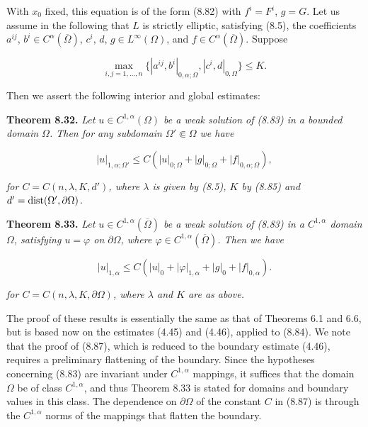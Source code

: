With $x_0$ fixed, this equation is of the form (8.82) with $f^i = F^i$, $g = G$.
Let us assume in the following that $L$ is strictly elliptic, satisfying (8.5), the coefficients $a^{ij}$, $b^i \in C^{\alpha}(\overline{\Omega})$, $c^i$, $d$, $g \in L^{\infty}(\Omega)$, and $f \in C^{\alpha}(\overline{\Omega})$. Suppose

\begin{equation}
\max_{i,j=1,\dots,n}\bigl\{|a^{ij}, b^i|_{0,\alpha;\Omega}, |c^i, d|_{0,\Omega}\bigr\} \le K.
\tag{8.85}
\end{equation}

Then we assert the following interior and global estimates:

\textbf{Theorem 8.32.} \textit{Let $u \in C^{1,\alpha}(\Omega)$ be a weak solution of (8.83) in a bounded domain $\Omega$.
Then for any subdomain $\Omega' \Subset \Omega$ we have}

\begin{equation}
|u|_{1,\alpha;\Omega'} \le C(|u|_{0;\Omega} + |g|_{0;\Omega} + |f|_{0,\alpha;\Omega}),
\tag{8.86}
\end{equation}

\textit{for $C = C(n,\lambda,K,d')$, where $\lambda$ is given by (8.5), $K$ by (8.85) and $d' = \operatorname{dist}(\Omega', \partial\Omega)$.}

\textbf{Theorem 8.33.} \textit{Let $u \in C^{1,\alpha}(\overline{\Omega})$ be a weak solution of (8.83) in a $C^{1,\alpha}$ domain $\Omega$, satisfying $u = \varphi$ on $\partial\Omega$, where $\varphi \in C^{1,\alpha}(\overline{\Omega})$. Then we have}

\begin{equation}
|u|_{1,\alpha} \le C(|u|_0 + |\varphi|_{1,\alpha} + |g|_0 + |f|_{0,\alpha}).
\tag{8.87}
\end{equation}

\textit{for $C = C(n,\lambda,K,\partial\Omega)$, where $\lambda$ and $K$ are as above.}

The proof of these results is essentially the same as that of Theorems 6.1 and 6.6, but is based now on the estimates (4.45) and (4.46), applied to (8.84). We note that the proof of (8.87), which is reduced to the boundary estimate (4.46), requires a preliminary flattening of the boundary. Since the hypotheses concerning (8.83) are invariant under $C^{1,\alpha}$ mappings, it suffices that the domain $\Omega$ be of class $C^{1,\alpha}$, and thus Theorem 8.33 is stated for domains and boundary values in this class. The dependence on $\partial\Omega$ of the constant $C$ in (8.87) is through the $C^{1,\alpha}$ norms of the mappings that flatten the boundary.



